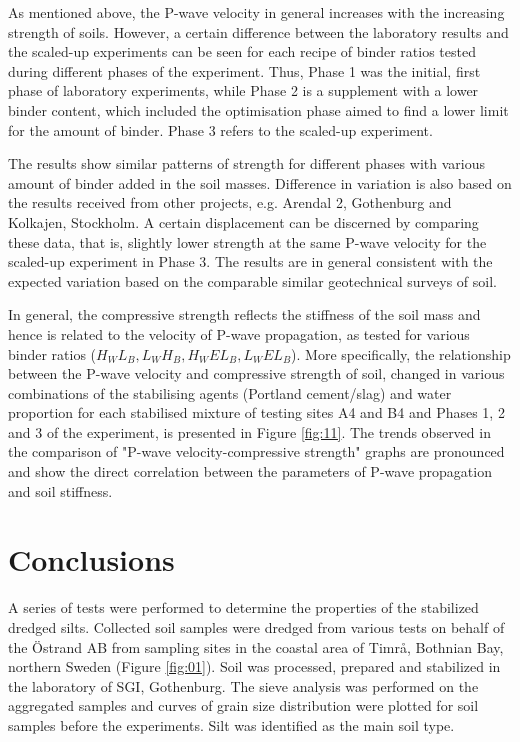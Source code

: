 \documentclass{amestyle}
\begin{document}
As mentioned above, the P-wave velocity in general increases with the increasing strength of soils. However, a certain difference between the laboratory results and the scaled-up experiments can be seen for each recipe of binder ratios tested during different phases of the experiment. Thus, Phase 1 was the initial, first phase of laboratory experiments, while Phase 2 is a supplement with a lower binder content, which included the optimisation phase aimed to find a lower limit for the amount of binder. Phase 3 refers to the scaled-up experiment. 

The results show similar patterns of strength for different phases with various amount of binder added in the soil masses. Difference in variation is also based on the results received from other projects, e.g. Arendal 2, Gothenburg and Kolkajen, Stockholm. A certain displacement can be discerned by comparing these data, that is, slightly lower strength at the same P-wave velocity for the scaled-up experiment in Phase 3. The results are in general consistent with the expected variation based on the comparable similar geotechnical surveys of soil. 

In general, the compressive strength reflects the stiffness of the soil mass and hence is related to the velocity of P-wave propagation, as tested for various binder ratios ($H_WL_B, L_WH_B, H_WEL_B, L_WEL_B$). More specifically, the relationship between the P-wave velocity and compressive strength of soil, changed in various combinations of the stabilising agents (Portland cement/slag) and water proportion for each stabilised mixture of testing sites A4 and B4 and Phases 1, 2 and 3 of the experiment, is presented in Figure \ref{fig:11}. The trends observed in the comparison of "P-wave velocity-compressive strength" graphs are pronounced and show the direct correlation between the parameters of P-wave propagation and soil stiffness. 

\section{Conclusions}
\label{sec:conclusions}

A series of tests were performed to determine the properties of the stabilized dredged silts. Collected soil samples were dredged from various tests on behalf of the Östrand AB from sampling sites in the coastal area of Timrå, Bothnian Bay, northern Sweden (Figure \ref{fig:01}). Soil was processed, prepared and stabilized in the laboratory of SGI, Gothenburg. The sieve analysis was performed on the aggregated samples and curves of grain size distribution were plotted for soil samples before the experiments. Silt was identified as the main soil type. 
\end{document}
